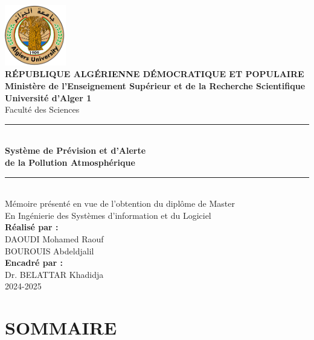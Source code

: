 \documentclass[12pt,a4paper]{report}
\begin{document}
\newpage
\begin{titlepage}
\begin{center}
    \includegraphics[width=0.2\textwidth]{logo_universite.png}\\[1cm]
    
    {\Large \textbf{RÉPUBLIQUE ALGÉRIENNE DÉMOCRATIQUE ET POPULAIRE}}\\[0.5cm]
    {\large \textbf{Ministère de l'Enseignement Supérieur et de la Recherche Scientifique}}\\[0.5cm]
    {\large \textbf{Université d'Alger 1}}\\
    {\large Faculté des Sciences}\\[0.5cm]

    \rule{\linewidth}{0.5mm} \\[0.4cm]
    {\Huge \textbf{Système de Prévision et d’Alerte\\ de la Pollution Atmosphérique}}\\[0.4cm]
    \rule{\linewidth}{0.5mm} \\[1cm]
    
    {\large Mémoire présenté en vue de l’obtention du diplôme de Master}\\
    {\large En Ingénierie des Systèmes d’information et du Logiciel}\\[1cm]

    \textbf{Réalisé par :}\\
    {\large DAOUDI Mohamed Raouf\\
    BOUROUIS Abdeldjalil}\\[1cm]

    \textbf{Encadré par :}\\
    {\large Dr. BELATTAR Khadidja}\\[1cm]
    
    {\large 2024-2025}
\end{center}
\end{titlepage}

\newpage
{}
{}
\chapter*{SOMMAIRE}
\tableofcontents
\end{document}
